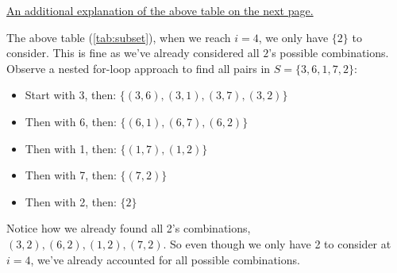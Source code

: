 \begin{table}[h!]
    \centering
    \caption{Subset Sum Dynamic Programming Table (DP Table), where $OTP[i][t]$ is the max combination $P$ of $S_i,\dots,S_n$ s.t., $P\leq t$.}
    \label{tab:subset}
    \end{table}

    \noindent
    \underline{An additional explanation of the above table on the next page.}

    \newpage

    \noindent
    The above table (\ref{tab:subset}), when we reach $i=4$, we only have $\{2\}$ to consider. This is fine as we've
    already considered all $2$'s possible combinations. Observe a nested for-loop approach to find all pairs in $S=\{3,6,1,7,2\}$:

    \begin{itemize}
        \item Start with 3, then: $\{(3,6),(3,1),(3,7),(3,2)\}$
        \item Then with 6, then: $\{(6,1),(6,7),(6,2)\}$
        \item Then with 1, then: $\{(1,7),(1,2)\}$
        \item Then with 7, then: $\{(7,2)\}$
        \item Then with 2, then: $\{2\}$
    \end{itemize}

    \noindent
    Notice how we already found all 2's combinations, $(3,2),(6,2),(1,2),(7,2)$. So even though we only have 2 to consider at $i=4$, we've
    already accounted for all possible combinations.\\

